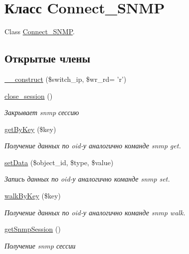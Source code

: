 \hypertarget{class_connect___s_n_m_p}{\section{Класс Connect\-\_\-\-S\-N\-M\-P}
\label{class_connect___s_n_m_p}
}


Class \hyperlink{class_connect___s_n_m_p}{Connect\-\_\-\-S\-N\-M\-P}.  


\subsection*{Открытые члены}
\begin{DoxyCompactItemize}
\item 
\hyperlink{class_connect___s_n_m_p_a8a4beac9f8314f8e4f86f29b4cf619a0}{\-\_\-\-\_\-construct} (\$switch\-\_\-ip, \$wr\-\_\-rd= 'r')
\item 
\hyperlink{class_connect___s_n_m_p_a2266e0810688c5e97603e08be2733771}{close\-\_\-session} ()
\begin{DoxyCompactList}\small\item\em Закрывает snmp сессию \end{DoxyCompactList}\item 
\hyperlink{class_connect___s_n_m_p_ad6dcf9d79ad7d6839e1639c3d6f1ce47}{get\-By\-Key} (\$key)
\begin{DoxyCompactList}\small\item\em Получение данных по oid-\/у аналогично команде snmp get. \end{DoxyCompactList}\item 
\hyperlink{class_connect___s_n_m_p_a7d9b0650197ccf543efa794508f7fbd6}{set\-Data} (\$object\-\_\-id, \$type, \$value)
\begin{DoxyCompactList}\small\item\em Запись данных по oid-\/у аналогично команде snmp set. \end{DoxyCompactList}\item 
\hyperlink{class_connect___s_n_m_p_a0cf9c2e32cb02151e4d117af3ec13b39}{walk\-By\-Key} (\$key)
\begin{DoxyCompactList}\small\item\em Получение данных по oid-\/у аналогично команде snmp walk. \end{DoxyCompactList}\item 
\hyperlink{class_connect___s_n_m_p_a91a834f81bf2db67f0523d92666db887}{get\-Snmp\-Session} ()
\begin{DoxyCompactList}\small\item\em Получение snmp сессии \end{DoxyCompactList}\end{DoxyCompactItemize}


